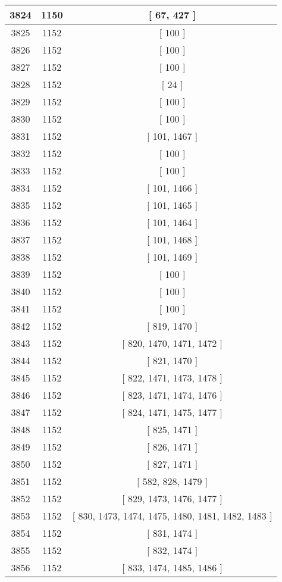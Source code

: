 \begin{center}
\begin{longtable}[H]{|| c c c ||}
\hline
3824 & 1150 & [ 67, 427 ] \\ 
\hline
3825 & 1152 & [ 100 ] \\ 
\hline
3826 & 1152 & [ 100 ] \\ 
\hline
3827 & 1152 & [ 100 ] \\ 
\hline
3828 & 1152 & [ 24 ] \\ 
\hline
3829 & 1152 & [ 100 ] \\ 
\hline
3830 & 1152 & [ 100 ] \\ 
\hline
3831 & 1152 & [ 101, 1467 ] \\ 
\hline
3832 & 1152 & [ 100 ] \\ 
\hline
3833 & 1152 & [ 100 ] \\ 
\hline
3834 & 1152 & [ 101, 1466 ] \\ 
\hline
3835 & 1152 & [ 101, 1465 ] \\ 
\hline
3836 & 1152 & [ 101, 1464 ] \\ 
\hline
3837 & 1152 & [ 101, 1468 ] \\ 
\hline
3838 & 1152 & [ 101, 1469 ] \\ 
\hline
3839 & 1152 & [ 100 ] \\ 
\hline
3840 & 1152 & [ 100 ] \\ 
\hline
3841 & 1152 & [ 100 ] \\ 
\hline
3842 & 1152 & [ 819, 1470 ] \\ 
\hline
3843 & 1152 & [ 820, 1470, 1471, 1472 ] \\ 
\hline
3844 & 1152 & [ 821, 1470 ] \\ 
\hline
3845 & 1152 & [ 822, 1471, 1473, 1478 ] \\ 
\hline
3846 & 1152 & [ 823, 1471, 1474, 1476 ] \\ 
\hline
3847 & 1152 & [ 824, 1471, 1475, 1477 ] \\ 
\hline
3848 & 1152 & [ 825, 1471 ] \\ 
\hline
3849 & 1152 & [ 826, 1471 ] \\ 
\hline
3850 & 1152 & [ 827, 1471 ] \\ 
\hline
3851 & 1152 & [ 582, 828, 1479 ] \\ 
\hline
3852 & 1152 & [ 829, 1473, 1476, 1477 ] \\ 
\hline
3853 & 1152 & [ 830, 1473, 1474, 1475, 1480, 1481, 1482, 1483 ] \\ 
\hline
3854 & 1152 & [ 831, 1474 ] \\ 
\hline
3855 & 1152 & [ 832, 1474 ] \\ 
\hline
3856 & 1152 & [ 833, 1474, 1485, 1486 ] \\ 

\end{longtable}
\end{center}
